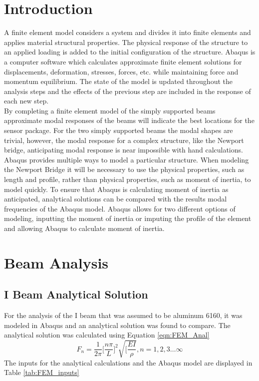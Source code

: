 \section{Introduction}
\indent A finite element model considers a system and divides it into finite elements and applies material structural properties. The physical response of the structure to an applied loading is added to the initial configuration of the structure. Abaqus is a computer software which calculates approximate finite element solutions for displacements, deformation, stresses, forces, etc. while maintaining force and momentum equilibrium. The state of the model is updated throughout the analysis steps and the effects of the previous step are included in the response of each new step. \\
\indent By completing a finite element model of the simply supported beams approximate modal responses of the beams will indicate the best locations for the sensor package. For the two simply supported beams the modal shapes are trivial, however, the modal response for a complex structure, like the Newport bridge, anticipating modal response is near impossible with hand calculations. \\
\indent Abaqus provides multiple ways to model a particular structure. When modeling the Newport Bridge it will be necessary to use the physical properties, such as length and profile, rather than physical properties, such as moment of inertia, to model quickly. To ensure that Abaqus is calculating moment of inertia as anticipated, analytical solutions can be compared with the results modal frequencies of the Abaqus model. Abaqus allows for two different options of modeling, inputting the moment of inertia or imputing the profile of the element and allowing Abaqus to calculate moment of inertia. \\

\section{Beam Analysis}
\subsection{I Beam Analytical Solution}
\indent For the analysis of the I beam that was assumed to be aluminum 6160, it was modeled in Abaqus and an analytical solution was found to compare. The analytical solution was calculated using Equation \ref{eqn:FEM_Anal}\\
\begin{equation}
F_{n}=\frac{1}{2\pi}\biggl[\frac{n \pi}{L} \biggr]^{2}\sqrt{[\frac{EI}{\rho}} , n=1,2,3\dots\infty
\label{eqn:FEM_Anal}
\end{equation}
\noindent The inputs for the analytical calculations and the Abaqus model are displayed in Table \ref{tab:FEM_inputs}

